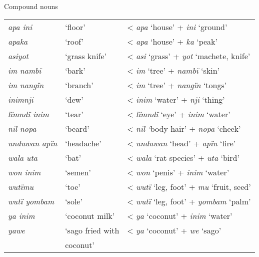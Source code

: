 \ea%
    \label{ex:nouns:43}
          Compound nouns\\
          \begin{tabular}[t]{lll}
    \textit{apa ini}   &  ‘floor’ & < \textit{apa} ‘house’ + \textit{ini} ‘ground’\\

    \textit{apaka}   &   ‘roof’ & < \textit{apa} ‘house’ + \textit{ka} ‘peak’\\

    \textit{asiyot}  &    ‘grass knife’ & < \textit{asi} ‘grass’ + \textit{yot} ‘machete, knife’\\

    \textit{im nambï} &  ‘bark’ & < \textit{im} ‘tree’ + \textit{nambï} ‘skin’\\

    \textit{im nangïn} &   ‘branch’ & < \textit{im} ‘tree’ + \textit{nangïn} ‘tongs’\\

    \textit{inimnji}  &    ‘dew’ & < \textit{inim} ‘water’ + \textit{nji} ‘thing’\\

 \textit{lïmndï inim} & ‘tear’ & < \textit{lïmndï} ‘eye’ + \textit{inim} ‘water’\\

    \textit{nil nopa} &   ‘beard’ & < \textit{nil ‘}body hair’ + \textit{nopa} ‘cheek’\\

 \textit{unduwan apïn} & ‘headache’ & < \textit{unduwan} ‘head’ + \textit{apïn} ‘fire’\\

 \textit{wala uta}  &  ‘bat’ & < \textit{wala} ‘rat species’ + \textit{uta} ‘bird’\\

 \textit{won inim}  &  ‘semen’ & < \textit{won} ‘penis’ + \textit{inim} ‘water’\\

 \textit{wutïmu}  &    ‘toe’ & < \textit{wutï} ‘leg, foot’ + \textit{mu} ‘fruit, seed’\\

    \textit{wutï yombam} & ‘sole’ & < \textit{wutï} ‘leg, foot’ + \textit{yombam} ‘palm’\\

 \textit{ya inim} &  ‘coconut milk’ & < \textit{ya} ‘coconut’ + \textit{inim} ‘water’\\

    \textit{yawe}  &    ‘sago fried with & < \textit{ya} ‘coconut’ + \textit{we} ‘sago’\\
    & coconut’ &\\
\end{tabular}
\z

